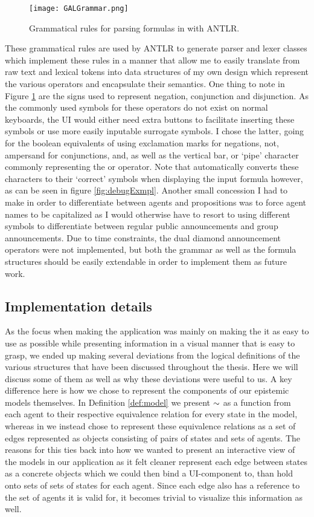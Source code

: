 \begin{figure}[h]
	\label{fig:grammar}
	\caption{Grammatical rules for parsing formulas in \cname with ANTLR. }
	\texttt{[image: GALGrammar.png]}
\end{figure}

These grammatical rules are used by ANTLR to generate parser and lexer classes which implement these rules in a manner that allow me to easily translate from raw text and lexical tokens into data structures of my own design which represent the various operators and encapsulate their semantics. One thing to note in Figure \ref{fig:grammar} are the signs used to represent negation, conjunction and disjunction. As the commonly used symbols for these operators do not exist on normal keyboards, the UI would either need extra buttons to facilitate inserting these symbols or use more easily inputable surrogate symbols. I chose the latter, going for the boolean equivalents of using exclamation marks for negations, not, ampersand for conjunctions, and, as well as the vertical bar, or `pipe' character commonly representing the or operator. Note that \cname automatically converts these characters to their `correct' symbols when displaying the input formula however, as can be seen in figure \ref{fig:debugExmpl}. 
Another small concession I had to make in order to differentiate between agents and propositions was to force agent names to be capitalized as I would otherwise have to resort to using different symbols to differentiate between regular public announcements and group announcements. Due to time constraints, the dual diamond announcement operators were not implemented, but both the grammar as well as the formula structures should be easily extendable in order to implement them as future work.

\subsection{Implementation details}

As the focus when making the application was mainly on making the it as easy to use as possible while presenting information in a visual manner that is easy to grasp, we ended up making several deviations from the logical definitions of the various structures that have been discussed throughout the thesis. Here we will discuss some of them as well as why these deviations were useful to us. A key difference here is how we chose to represent the components of our epistemic models themselves.  In Definition \ref{def:model} we present $\sim$ as a function from each agent to their respective equivalence relation for every state in the model, whereas in \cname we instead chose to represent these equivalence relations as a set of edges represented as objects consisting of pairs of states and sets of agents. The reasons for this ties back into how we wanted to present an interactive view of the models in our application as it felt cleaner represent each edge between states as a concrete objects which we could then bind a UI-component to, than hold onto sets of sets of states for each agent. Since each edge also has a reference to the set of agents it is valid for, it becomes trivial to visualize this information as well.

